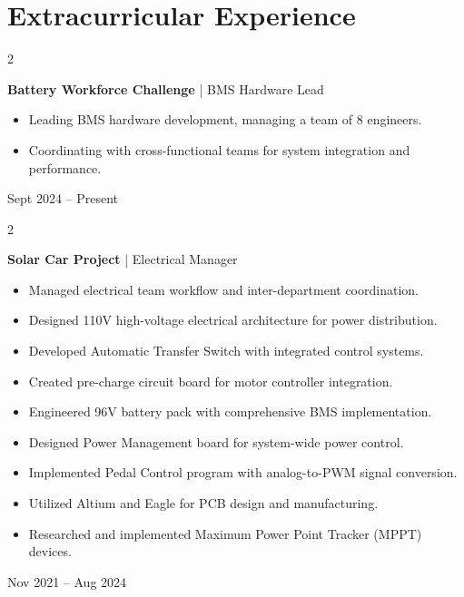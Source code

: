\documentclass[10pt, letterpaper]{article}
\newenvironment{highlights}{
    \begin{itemize}[
        topsep=0.10 cm,
        parsep=0.10 cm,
        partopsep=0pt,
        itemsep=0pt,
        leftmargin=0.4 cm + 10pt
    ]
}{
    \end{itemize}
} %
\newenvironment{twocolentry}[2][]{
    \onecolentry
    \def\secondColumn{#2}
    \setcolumnwidth{\fill, 4.5 cm}
    \begin{paracol}{2}
}{
    \switchcolumn \raggedleft \secondColumn
    \end{paracol}
    \endonecolentry
} %
\begin{document}
    \section{Extracurricular Experience}
        \begin{twocolentry}{Sept 2024 – Present}
            \textbf{Battery Workforce Challenge} | BMS Hardware Lead
            \begin{highlights}
                \item Leading BMS hardware development, managing a team of 8 engineers.
                \item Coordinating with cross-functional teams for system integration and performance.
            \end{highlights}
        \end{twocolentry}

    \vspace{0.2 cm} %

        \begin{twocolentry}{Nov 2021 – Aug 2024}
            \textbf{Solar Car Project} | Electrical Manager
            \begin{highlights}
                \item Managed electrical team workflow and inter-department coordination.
                \item Designed 110V high-voltage electrical architecture for power distribution.
                \item Developed Automatic Transfer Switch with integrated control systems.
                \item Created pre-charge circuit board for motor controller integration.
                \item Engineered 96V battery pack with comprehensive BMS implementation.
                \item Designed Power Management board for system-wide power control.
                \item Implemented Pedal Control program with analog-to-PWM signal conversion.
                \item Utilized Altium and Eagle for PCB design and manufacturing.
                \item Researched and implemented Maximum Power Point Tracker (MPPT) devices.
            \end{highlights}
        \end{twocolentry}

        \vspace{1 cm} %
\end{document}
